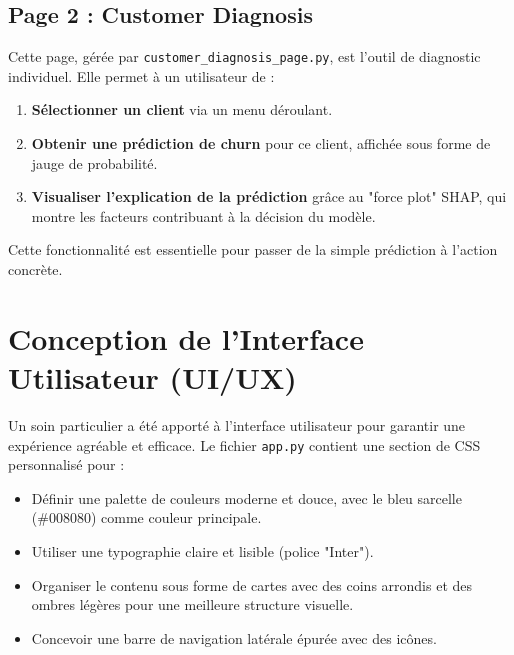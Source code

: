 
\subsection{Page 2 : Customer Diagnosis}
Cette page, gérée par \texttt{customer\_diagnosis\_page.py}, est l'outil de diagnostic individuel. Elle permet à un utilisateur de :
\begin{enumerate}
    \item \textbf{Sélectionner un client} via un menu déroulant.
    \item \textbf{Obtenir une prédiction de churn} pour ce client, affichée sous forme de jauge de probabilité.
    \item \textbf{Visualiser l'explication de la prédiction} grâce au "force plot" SHAP, qui montre les facteurs contribuant à la décision du modèle.
\end{enumerate}
Cette fonctionnalité est essentielle pour passer de la simple prédiction à l'action concrète.


\section{Conception de l'Interface Utilisateur (UI/UX)}
Un soin particulier a été apporté à l'interface utilisateur pour garantir une expérience agréable et efficace. Le fichier \texttt{app.py} contient une section de CSS personnalisé pour :
\begin{itemize}
    \item Définir une palette de couleurs moderne et douce, avec le bleu sarcelle (\#008080) comme couleur principale.
    \item Utiliser une typographie claire et lisible (police "Inter").
    \item Organiser le contenu sous forme de cartes avec des coins arrondis et des ombres légères pour une meilleure structure visuelle.
    \item Concevoir une barre de navigation latérale épurée avec des icônes.
\end{itemize}


